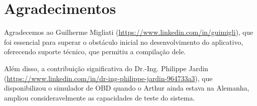 \chapter*{Agradecimentos}

\noindent
Agradecemos ao Guilherme Migliati (\url{https://www.linkedin.com/in/guimigli}), que foi essencial para superar o obstáculo inicial no desenvolvimento do aplicativo, oferecendo suporte técnico, que permitiu a compilação dele.

\noindent 
Além disso, a contribuição significativa do Dr.-Ing. Philippe Jardin (\url{https://www.linkedin.com/in/dr-ing-philippe-jardin-964733a3}), que disponibilizou o simulador de OBD quando o Arthur ainda estava na Alemanha, ampliou consideravelmente as capacidades de teste do sistema. 

